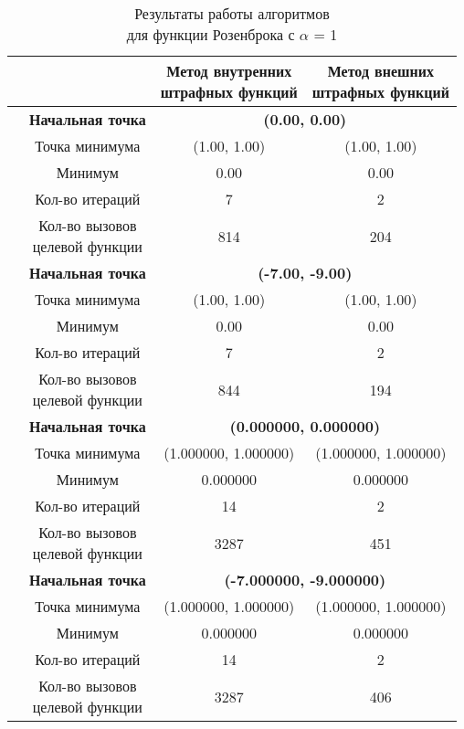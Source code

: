 \begin{table}[H]
        \centering
        \vspace*{-1.5em}
        \caption{Результаты работы алгоритмов\\для функции Розенброка с $\alpha$ = 1}
        \footnotesize
        \begin{tabular}{|c|c|c|c|}
        \hline
        & &\makecell{Метод внутренних\\штрафных функций} &\makecell{Метод внешних\\штрафных функций} \\
        \hline
	\multirow{8}{*}{\rotatebox[origin=c]{90}{$\varepsilon = 0.01$}}&\textbf{Начальная точка} &\multicolumn{2}{c|}{\textbf{(0.00, 0.00)}}\\
	\cline{2-4}
	&Точка минимума &(1.00, 1.00) &(1.00, 1.00) \\ 
	\cline{2-4}
	&Минимум &0.00 &0.00 \\ 
	\cline{2-4}
	&Кол-во итераций &7 &2 \\ 
	\cline{2-4}
	&\makecell{Кол-во вызовов\\целевой функции} &814 &204 \\ 
	\cline{2-4}
\cline{2-4}&\textbf{Начальная точка} &\multicolumn{2}{c|}{\textbf{(-7.00, -9.00)}}\\
	\cline{2-4}
	&Точка минимума &(1.00, 1.00) &(1.00, 1.00) \\ 
	\cline{2-4}
	&Минимум &0.00 &0.00 \\ 
	\cline{2-4}
	&Кол-во итераций &7 &2 \\ 
	\cline{2-4}
	&\makecell{Кол-во вызовов\\целевой функции} &844 &194 \\ 
	\cline{2-4}
	\hline
	\multirow{8}{*}{\rotatebox[origin=c]{90}{$\varepsilon = 1e-06$}}&\textbf{Начальная точка} &\multicolumn{2}{c|}{\textbf{(0.000000, 0.000000)}}\\
	\cline{2-4}
	&Точка минимума &(1.000000, 1.000000) &(1.000000, 1.000000) \\ 
	\cline{2-4}
	&Минимум &0.000000 &0.000000 \\ 
	\cline{2-4}
	&Кол-во итераций &14 &2 \\ 
	\cline{2-4}
	&\makecell{Кол-во вызовов\\целевой функции} &3287 &451 \\ 
	\cline{2-4}
\cline{2-4}&\textbf{Начальная точка} &\multicolumn{2}{c|}{\textbf{(-7.000000, -9.000000)}}\\
	\cline{2-4}
	&Точка минимума &(1.000000, 1.000000) &(1.000000, 1.000000) \\ 
	\cline{2-4}
	&Минимум &0.000000 &0.000000 \\ 
	\cline{2-4}
	&Кол-во итераций &14 &2 \\ 
	\cline{2-4}
	&\makecell{Кол-во вызовов\\целевой функции} &3287 &406 \\ 
	\cline{2-4}
	\hline

\end{tabular}
\end{table}


